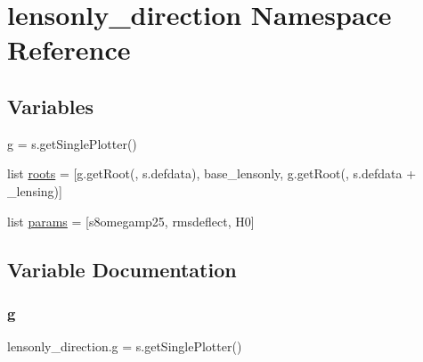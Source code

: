 \hypertarget{namespacelensonly__direction}{}\section{lensonly\+\_\+direction Namespace Reference}
\label{namespacelensonly__direction}
\subsection*{Variables}
\begin{DoxyCompactItemize}
\item 
\mbox{\hyperlink{namespacelensonly__direction_ad154dc2b68d978da406c59f1c6374e62}{g}} = s.\+get\+Single\+Plotter()
\item 
list \mbox{\hyperlink{namespacelensonly__direction_a62d23d1a04b35eed091d40fd954fcda8}{roots}} = \mbox{[}g.\+get\+Root(\textquotesingle{}\textquotesingle{}, s.\+defdata), \textquotesingle{}base\+\_\+lensonly\textquotesingle{}, g.\+get\+Root(\textquotesingle{}\textquotesingle{}, s.\+defdata + \textquotesingle{}\+\_\+lensing\textquotesingle{})\mbox{]}
\item 
list \mbox{\hyperlink{namespacelensonly__direction_a280e56d1570b3b3e0bdab772b1636976}{params}} = \mbox{[}\textquotesingle{}s8omegamp25\textquotesingle{}, \textquotesingle{}rmsdeflect\textquotesingle{}, \textquotesingle{}H0\textquotesingle{}\mbox{]}
\end{DoxyCompactItemize}


\subsection{Variable Documentation}
\mbox{\label{namespacelensonly__direction_ad154dc2b68d978da406c59f1c6374e62}} 
\subsubsection{\texorpdfstring{g}{g}}
{\footnotesize\ttfamily lensonly\+\_\+direction.\+g = s.\+get\+Single\+Plotter()}

\mbox{\label{namespacelensonly__direction_a280e56d1570b3b3e0bdab772b1636976}} 
